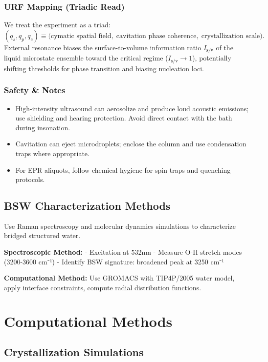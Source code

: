\documentclass[12pt,oneside]{memoir}
\theoremstyle{plain}
\theoremstyle{definition}
\theoremstyle{remark}
\newcommand{\Isv}{\ensuremath{I_{\mathrm{s}/\mathrm{v}}}}
\newcommand{\qS}{\ensuremath{q_s}}
\newcommand{\qP}{\ensuremath{q_p}}
\newcommand{\qC}{\ensuremath{q_c}}
\begin{document}
\subsection*{URF Mapping (Triadic Read)}
\noindent We treat the experiment as a triad:
\[
(\qS,\qP,\qC) \equiv \big(\text{cymatic spatial field},\; \text{cavitation phase coherence},\; \text{crystallization scale}\big).
\]
External resonance biases the surface-to-volume information ratio \(\Isv\) of the liquid microstate ensemble toward the critical regime (\(\Isv \to 1\)), potentially shifting thresholds for phase transition and biasing nucleation loci.

\subsection*{Safety \& Notes}
\begin{itemize}[leftmargin=1.2em]
  \item High-intensity ultrasound can aerosolize and produce loud acoustic emissions; use shielding and hearing protection. Avoid direct contact with the bath during insonation.
  \item Cavitation can eject microdroplets; enclose the column and use condensation traps where appropriate.
  \item For EPR aliquots, follow chemical hygiene for spin traps and quenching protocols.
\end{itemize}

\section{BSW Characterization Methods}

Use Raman spectroscopy and molecular dynamics simulations to characterize bridged structured water.

\textbf{Spectroscopic Method:}
- Excitation at 532nm
- Measure O-H stretch modes (3200-3600 cm⁻¹)
- Identify BSW signature: broadened peak at 3250 cm⁻¹

\textbf{Computational Method:}
Use GROMACS with TIP4P/2005 water model, apply interface constraints, compute radial distribution functions.

\chapter{Computational Methods}

\section{Crystallization Simulations}
\end{document}
